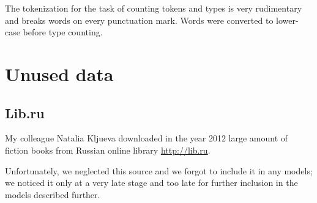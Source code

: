 The tokenization for the task of counting tokens and types is very rudimentary and breaks words on every punctuation mark. Words were converted to lower-case before type counting.


\section{Unused data}
\subsection{Lib.ru}

My colleague Natalia Kljueva downloaded in the year 2012 large amount of fiction books from Russian online library \url{http://lib.ru}.

Unfortunately, we neglected this source and we forgot to include it in any models; we noticed it only at a very late stage and too late for further inclusion in the models described further.
